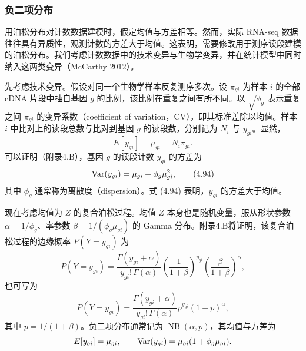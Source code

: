 \subsubsection{负二项分布}

用泊松分布对计数数据建模时，假定均值与方差相等。然而，实际 RNA-seq 数据往往具有异质性，观测计数的方差大于均值。这表明，需要修改用于测序读段建模的泊松分布。我们考虑计数数据中的技术变异与生物学变异，并在统计模型中同时纳入这两类变异（McCarthy 2012）。

先考虑技术变异。假设对同一个生物学样本反复测序多次。设 $\pi_{gi}$ 为样本 $i$ 的全部 cDNA 片段中抽自基因 $g$ 的比例，该比例在重复之间有所不同。以 $\sqrt{\phi_g}$ 表示重复之间 $\pi_{gi}$ 的变异系数（coefficient of variation，CV），即其标准差除以均值。样本 $i$ 中比对上的读段总数与比对到基因 $g$ 的读段数，分别记为 $N_i$ 与 $y_{gi}$。显然，
\begin{equation}
E[y_{gi}]=\mu_{gi}=N_i\pi_{gi}.
\tag{4.93}
\end{equation}
可以证明（附录4.B），基因 $g$ 的读段计数 $y_{gi}$ 的方差为
\begin{equation}
\operatorname{Var}(y_{gi})=\mu_{gi}+\phi_g\mu_{gi}^2,
\tag{4.94}
\end{equation}
其中 $\phi_g$ 通常称为离散度（dispersion）。式 (4.94) 表明，$y_{gi}$ 的方差大于均值。

现在考虑均值为 $Z$ 的复合泊松过程。均值 $Z$ 本身也是随机变量，服从形状参数 $\alpha=1/\phi_g$、率参数 $\beta=1/(\phi_g\mu_{gi})$ 的 Gamma 分布。附录4.B将证明，该复合泊松过程的边缘概率 $P(Y=y_{gi})$ 为
\begin{equation}
P(Y=y_{gi})=\frac{\Gamma(y_{gi}+\alpha)}{y_{gi}!\,\Gamma(\alpha)}
\left(\frac1{1+\beta}\right)^{y_{gi}}
\left(\frac\beta{1+\beta}\right)^\alpha,
\tag{4.95}
\end{equation}
也可写为
\begin{equation}
P(Y=y_{gi})=\frac{\Gamma(y_{gi}+\alpha)}{y_{gi}!\,\Gamma(\alpha)}
p^{y_{gi}}(1-p)^\alpha,
\tag{4.96}
\end{equation}
其中 $p=1/(1+\beta)$。负二项分布通常记为 $\operatorname{NB}(\alpha,p)$，其均值与方差为
\[
E[y_{gi}]=\mu_{gi},\qquad
\operatorname{Var}(y_{gi})=\mu_{gi}(1+\phi_g\mu_{gi}).
\]


